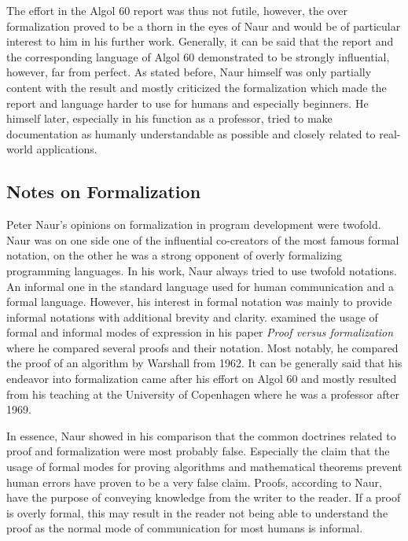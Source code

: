 \documentclass{article}
\begin{document}
The effort in the Algol 60 report was thus not futile, however, the over formalization proved to be a thorn in the eyes of Naur and would be of particular interest to him in his further work. Generally, it can be said that the report and the corresponding language of Algol 60 demonstrated to be strongly influential, however, far from perfect. As stated before, Naur himself was only partially content with the result and mostly criticized the formalization which made the report and language harder to use for humans and especially beginners. He himself later, especially in his function as a professor, tried to make documentation as humanly understandable as possible and closely related to real-world applications. 

\subsection{Notes on Formalization}
Peter Naur's opinions on formalization in program development were twofold. Naur was on one side one of the influential co-creators of the most famous formal notation, on the other he was a strong opponent of overly formalizing programming languages. In his work, Naur always tried to use twofold notations. An informal one in the standard language used for human communication and a formal language. However, his interest in formal notation was mainly to provide informal notations with additional brevity and clarity. \cite{naur1994proof} examined the usage of formal and informal modes of expression in his paper \textit{Proof versus formalization} where he compared several proofs and their notation. Most notably, he compared the proof of an algorithm by Warshall from 1962. It can be generally said that his endeavor into formalization came after his effort on Algol 60 and mostly resulted from his teaching at the University of Copenhagen where he was a professor after 1969.

In essence, Naur showed in his comparison that the common doctrines related to proof and formalization were most probably false. Especially the claim that the usage of formal modes for proving algorithms and mathematical theorems prevent human errors have proven to be a very false claim. Proofs, according to Naur, have the purpose of conveying knowledge from the writer to the reader. If a proof is overly formal, this may result in the reader not being able to understand the proof as the normal mode of communication for most humans is informal.
\end{document}
